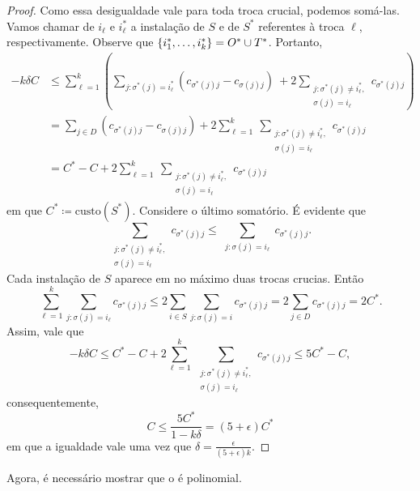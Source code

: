 \begin{proof}
Como essa desigualdade vale para toda troca crucial, podemos somá-las. Vamos chamar de $i_\ell$ e $i_\ell^*$ a instalação de $S$ e de $S^*$ referentes à troca $\ell$, respectivamente. Observe que $\{i^*_1,\ldots,i^*_k\} = O^* \cup T^* $. Portanto,
\begin{subequations}
\begin{align*}
- k \delta C &\leq \sum_{\ell = 1}^k \left(  \sum_{j : \sigma^*(j) = i_\ell^*} (c_{\sigma^*(j)j} - c_{\sigma(j)j}) \ + 2 \sum_{\substack{ j : \sigma^*(j)\neq i_\ell^*,\\  \sigma(j) = i_\ell}} c_{\sigma^*(j)j}     \right) \\
&= \sum_{j\in D} (c_{\sigma^*(j)j} - c_{\sigma(j)j}) + 2 \sum_{\ell = 1}^k \ \sum_{\substack{ j : \sigma^*(j)\neq i_\ell^*,\\  \sigma(j) = i_\ell}} c_{\sigma^*(j)j} \\
&= C^* - C + 2 \sum_{\ell = 1}^k \ \sum_{\substack{ j : \sigma^*(j)\neq i_\ell^*,\\  \sigma(j) = i_\ell}} c_{\sigma^*(j)j}
\end{align*}
\end{subequations}
em que $C^* \coloneqq \text{custo}(S^*)$. Considere o último somatório. É evidente que 
\[\sum_{\substack{ j : \sigma^*(j)\neq i_\ell^*,\\  \sigma(j) = i_\ell}} c_{\sigma^*(j)j} \leq \sum_{\substack{j:\sigma(j) = i_\ell}} c_{\sigma^*(j)j}.\]
Cada instalação de $S$ aparece em no máximo duas trocas crucias. Então
\[ \sum_{\ell=1}^k \sum_{j: \sigma(j) = i_\ell} c_{\sigma^*(j)j} \leq 2\sum_{i \in S} \sum_{j: \sigma(j) = i} c_{\sigma^*(j)j} = 2 \sum_{j\in D}c_{\sigma^*(j)j} =2 C^*.\]
Assim, vale que 
\[ - k \delta C \leq C^* - C + 2 \sum_{\ell = 1}^k \ \sum_{\substack{ j : \sigma^*(j)\neq i_\ell^*,\\  \sigma(j) = i_\ell}} c_{\sigma^*(j)j} \leq 5C^* - C,\]
consequentemente, 
\[C \leq \frac{5C^*}{1 - k\delta} = (5+\epsilon)C^*\]
em que a igualdade vale uma vez que $\delta = \frac{\epsilon}{(5+\epsilon)k}$.
\end{proof}
Agora, é necessário mostrar que o é polinomial.

